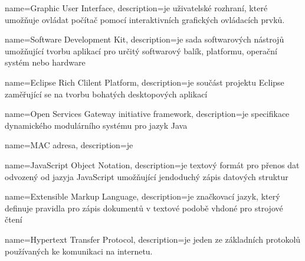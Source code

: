 {
	name=Graphic User Interface,
	description={je uživatelské rozhraní, které umožňuje ovládat počítač pomocí
	interaktivních grafických ovládacích prvků.}
}

{
	name=Software Development Kit,
	description={je sada softwarových nástrojů umožňující tvorbu aplikací pro
	určitý softwarový balík, platformu, operační systém nebo hardware}
}

{
	name=Eclipse Rich Clilent Platform,
	description={je součást projektu Eclipse zaměřující se na tvorbu bohatých
	desktopových aplikací} 
}

{
	name=Open Services Gateway initiative framework,
	description={je specifikace dynamického modulárního systému pro jazyk Java} 
}

{
	name=MAC adresa,
	description={je } 
}

{
	name=JavaScript Object Notation,
	description={je textový formát pro přenos dat odvozený od jazyja JavaScript
	umožňující jendoduchý zápis datových struktur} 
}

{
	name=Extensible Markup Language,
	description={je značkovací jazyk, který definuje pravidla pro zápis dokumentů
	v textové podobě vhdoné pro strojové čtení} 
}

{
	name=Hypertext Transfer Protocol,
	description={je jeden ze základních protokolů používaných ke komunikaci na
	internetu.} 
}



